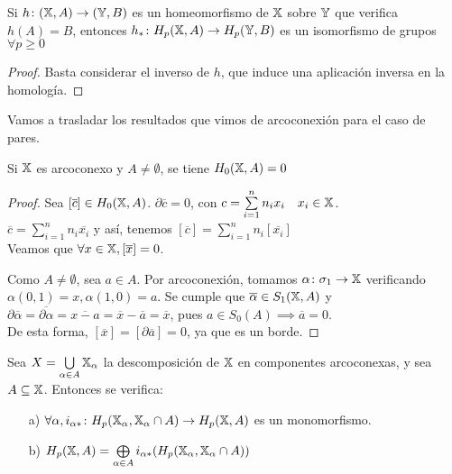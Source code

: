 \begin{corollary}
  Si $h \colon ({\mathbb X}, A) \to ({\mathbb Y}, B)$ es un homeomorfismo de ${\mathbb X}$ sobre ${\mathbb Y}$ que verifica $h(A) = B$, entonces
  $h_* \colon H_p({\mathbb X}, A) \to H_p({\mathbb Y}, B)$ es un isomorfismo de grupos $\forall p \geq 0$
\end{corollary}

\begin{proof}
  Basta considerar el inverso de $h$, que induce una aplicación inversa en la homología.
\end{proof}

Vamos a trasladar los resultados que vimos de arcoconexión para el caso de pares.

\begin{proposition}
  Si ${\mathbb X}$ es arcoconexo y $A \neq \emptyset$, se tiene $H_0({\mathbb X}, A) = 0$
\end{proposition}

\begin{proof}
  Sea $[\overline{c}] \in H_0({\mathbb X}, A)$. $\partial\overline{c} = 0$, con $c = \sum\limits_{i = 1}^n n_i x_i \quad x_i \in {\mathbb X}$. \\
  $\overline{c} = \sum\limits_{i = 1}^n n_i \overline{x_i}$ y así, tenemos $[\overline{c}] = \sum\limits_{i = 1}^n n_i [\overline{x_i}]$ \\
  Veamos que $\forall x \in {\mathbb X}, [\overline{x}] = 0$.

  Como $A \neq \emptyset$, sea $a \in A$. Por arcoconexión, tomamos $\alpha \colon \sigma_1 \to {\mathbb X}$ verificando $\alpha(0, 1) = x, \alpha(1, 0) = a$.
  Se cumple que $\overline{\alpha} \in S_1({\mathbb X}, A)$ y $\partial\overline{\alpha} = \overline{\partial\alpha} = \overline{x - a} = \overline{x} - \overline{a}
  = \overline{x}$, pues $a \in S_0(A) \implies \overline{a} = 0$. \\
  De esta forma, $[\overline{x}] = [\partial\overline{a}] = 0$, ya que es un borde.
\end{proof}

\begin{proposition}
  Sea $X = \bigcup\limits_{\alpha \in A} {\mathbb X}_\alpha$ la descomposición de ${\mathbb X}$ en componentes arcoconexas, y sea $A \subseteq {\mathbb X}$. Entonces se verifica:
  \begin{itemize}
    \item[a)] $\forall \alpha, i_{\alpha *} \colon H_p({\mathbb X}_\alpha, {\mathbb X}_\alpha \cap A) \to H_p({\mathbb X}, A)$ es un monomorfismo.
    \item[b)] $H_p({\mathbb X}, A) = \bigoplus\limits_{\alpha \in A}  i_{\alpha *}(H_p({\mathbb X}_\alpha, {\mathbb X}_\alpha \cap A))$
  \end{itemize}
\end{proposition}

